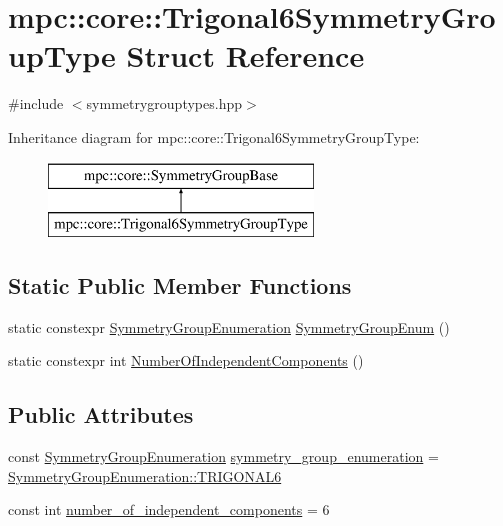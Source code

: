 \hypertarget{structmpc_1_1core_1_1_trigonal6_symmetry_group_type}{}\section{mpc\+:\+:core\+:\+:Trigonal6\+Symmetry\+Group\+Type Struct Reference}
\label{structmpc_1_1core_1_1_trigonal6_symmetry_group_type}


{\ttfamily \#include $<$symmetrygrouptypes.\+hpp$>$}

Inheritance diagram for mpc\+:\+:core\+:\+:Trigonal6\+Symmetry\+Group\+Type\+:\begin{figure}[H]
\begin{center}
\leavevmode
\includegraphics[height=2.000000cm]{structmpc_1_1core_1_1_trigonal6_symmetry_group_type}
\end{center}
\end{figure}
\subsection*{Static Public Member Functions}
\begin{DoxyCompactItemize}
\item 
static constexpr \mbox{\hyperlink{namespacempc_1_1core_a9d979684062547055a0ef5c13077bad8}{Symmetry\+Group\+Enumeration}} \mbox{\hyperlink{structmpc_1_1core_1_1_trigonal6_symmetry_group_type_a93136e8d9504c55a29dd114a6f8e9d16}{Symmetry\+Group\+Enum}} ()
\item 
static constexpr int \mbox{\hyperlink{structmpc_1_1core_1_1_trigonal6_symmetry_group_type_ac74e0669e3620ea8efe472182728a697}{Number\+Of\+Independent\+Components}} ()
\end{DoxyCompactItemize}
\subsection*{Public Attributes}
\begin{DoxyCompactItemize}
\item 
const \mbox{\hyperlink{namespacempc_1_1core_a9d979684062547055a0ef5c13077bad8}{Symmetry\+Group\+Enumeration}} \mbox{\hyperlink{structmpc_1_1core_1_1_trigonal6_symmetry_group_type_aee96fe6cfaf7272c1c335782a47da13d}{symmetry\+\_\+group\+\_\+enumeration}} = \mbox{\hyperlink{namespacempc_1_1core_a9d979684062547055a0ef5c13077bad8ad11b66b53c3c9dbfe73aa29a5d3df56c}{Symmetry\+Group\+Enumeration\+::\+T\+R\+I\+G\+O\+N\+A\+L6}}
\item 
const int \mbox{\hyperlink{structmpc_1_1core_1_1_trigonal6_symmetry_group_type_a376784d4a0e763c9c2900ea2af29528a}{number\+\_\+of\+\_\+independent\+\_\+components}} = 6
\end{DoxyCompactItemize}



